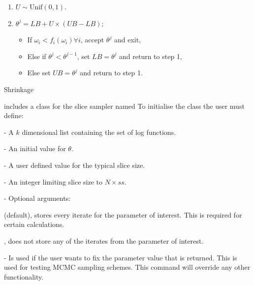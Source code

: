 \documentclass[article]{jss}
\begin{document}
%
\begin{algorithm}[H]
\begin{enumerate}
\item $U\sim\mbox{Unif}(0,1)$. 
\item $\theta^{j}=LB+U{\times}(UB-LB)$;

\begin{itemize}
\item If $\omega_{i}<f_{i}(\omega_{i})\forall i$, accept $\theta^{j}$
and exit, 
\item Else if $\theta^{j}<\theta^{j-1}$, set $LB=\theta^{j}$ and return
to step 1, 
\item Else set $UB=\theta^{j}$ and return to step 1. 
\end{itemize}
\end{enumerate}
\caption{Shrinkage}
\label{alg:shrinkage}
\end{algorithm}


 includes a class for the slice sampler named
To initialise the class the user must define:
\begin{description}
\item {} - A $k$ dimensional list containing the set of log
  functions.
\item {} - An initial value for $\theta$.
\item {} - A user defined value for the typical slice size.
\item {} - An integer limiting slice size to $N\times ss$.
\item {} - Optional arguments:
   
  \begin{description}
  \item {}
    \begin{description}
    \item {} (default), stores every iterate for the
      parameter of interest. This is required for certain
      calculations.
    \item {}, does not store any of the iterates from the
      parameter of interest.
    \end{description}
  \item {} - Is used if the user wants to fix the
    parameter value that is returned. This is used for testing MCMC
    sampling schemes.  This command will override any other
    functionality.
  \end{description}
\end{description}
\end{document}
